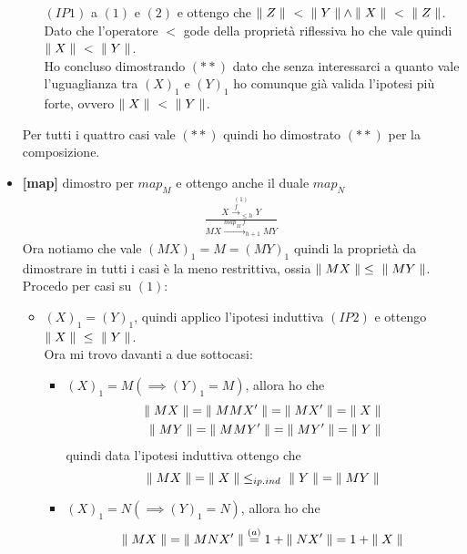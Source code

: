 \begin{itemize}
\begin{itemize}
        $(IP1)$ a $(1)$ e $(2)$ e ottengo che ${\parallel Z\parallel}\ <\ {\parallel Y\parallel} \land
        {\parallel X\parallel}\ <\ {\parallel Z\parallel}$.\\
        Dato che l'operatore $<$ gode della proprietà
        riflessiva ho che vale quindi ${\parallel X\parallel}\ <\ {\parallel Y\parallel}$.\\
        Ho concluso dimostrando $(**)$ dato che senza interessarci a quanto vale
        l'uguaglianza tra $(X)_1$ e $(Y)_1$ ho comunque già valida l'ipotesi più
        forte, ovvero ${\parallel X\parallel}\ <\ {\parallel Y\parallel}$.\\
    \end{itemize}
    Per tutti i quattro casi vale $(**)$ quindi ho dimostrato $(**)$ per la composizione.
    \item \textbf{[map]} dimostro per $map_M$ e ottengo anche il duale $map_N$
      \begin{align*}
          \frac{
            \overset{(1)}{X \overset{f}{\longrightarrow}_{\leq h} Y}
          }{MX \overset{map_M\ f}{\longrightarrow}_{h+1} MY}
      \end{align*}
      Ora notiamo che vale $(MX)_1 = M = (MY)_1$ quindi la proprietà da dimostrare
      in tutti i casi è la meno restrittiva, ossia ${\parallel MX\parallel} \leq\ {\parallel MY\parallel}$.\\
      Procedo per casi su $(1)$:
      \begin{itemize}
        \item $(X)_1 = (Y)_1$, quindi applico l'ipotesi induttiva $(IP2)$ e
          ottengo $\req{X}\ \leq\ \req{Y}$.\\
          Ora mi trovo davanti a due sottocasi:
          \begin{itemize}
            \item $(X)_1 = M (\implies (Y)_1 = M)$, allora ho che
              \begin{align*}
              {\parallel MX\parallel} = {\parallel MMX'\parallel} = {\parallel MX'\parallel} = {\parallel X\parallel}\\
              {\parallel MY\parallel} = {\parallel MMY'\parallel} = {\parallel MY'\parallel} = {\parallel Y\parallel}
              \end{align*}
              quindi data l'ipotesi induttiva ottengo che
            \begin{equation*}{\parallel MX\parallel} = {\parallel X\parallel} \leq_{ip. ind}\ {\parallel Y\parallel} = {\parallel MY\parallel}\end{equation*}
            \item $(X)_1 = N (\implies (Y)_1 = N)$, allora ho che
              \begin{align*}
              \req{MX} = \req{MNX'} \overset{(a)}{=} 1 + \req{NX'} = 1 + \req{X}\\

\end{align*}
\end{itemize}
\end{itemize}
\end{itemize}
